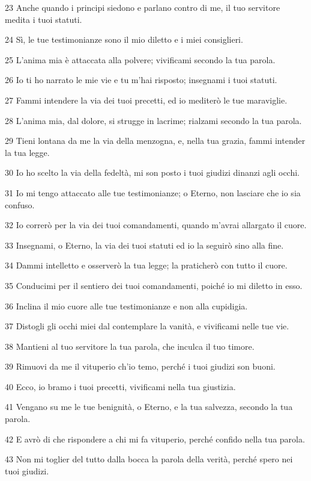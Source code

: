 \par 23 Anche quando i principi siedono e parlano contro di me, il tuo servitore medita i tuoi statuti.
\par 24 Sì, le tue testimonianze sono il mio diletto e i miei consiglieri.
\par 25 L'anima mia è attaccata alla polvere; vivificami secondo la tua parola.
\par 26 Io ti ho narrato le mie vie e tu m'hai risposto; insegnami i tuoi statuti.
\par 27 Fammi intendere la via dei tuoi precetti, ed io mediterò le tue maraviglie.
\par 28 L'anima mia, dal dolore, si strugge in lacrime; rialzami secondo la tua parola.
\par 29 Tieni lontana da me la via della menzogna, e, nella tua grazia, fammi intender la tua legge.
\par 30 Io ho scelto la via della fedeltà, mi son posto i tuoi giudizi dinanzi agli occhi.
\par 31 Io mi tengo attaccato alle tue testimonianze; o Eterno, non lasciare che io sia confuso.
\par 32 Io correrò per la via dei tuoi comandamenti, quando m'avrai allargato il cuore.
\par 33 Insegnami, o Eterno, la via dei tuoi statuti ed io la seguirò sino alla fine.
\par 34 Dammi intelletto e osserverò la tua legge; la praticherò con tutto il cuore.
\par 35 Conducimi per il sentiero dei tuoi comandamenti, poiché io mi diletto in esso.
\par 36 Inclina il mio cuore alle tue testimonianze e non alla cupidigia.
\par 37 Distogli gli occhi miei dal contemplare la vanità, e vivificami nelle tue vie.
\par 38 Mantieni al tuo servitore la tua parola, che inculca il tuo timore.
\par 39 Rimuovi da me il vituperio ch'io temo, perché i tuoi giudizi son buoni.
\par 40 Ecco, io bramo i tuoi precetti, vivificami nella tua giustizia.
\par 41 Vengano su me le tue benignità, o Eterno, e la tua salvezza, secondo la tua parola.
\par 42 E avrò di che rispondere a chi mi fa vituperio, perché confido nella tua parola.
\par 43 Non mi toglier del tutto dalla bocca la parola della verità, perché spero nei tuoi giudizi.
